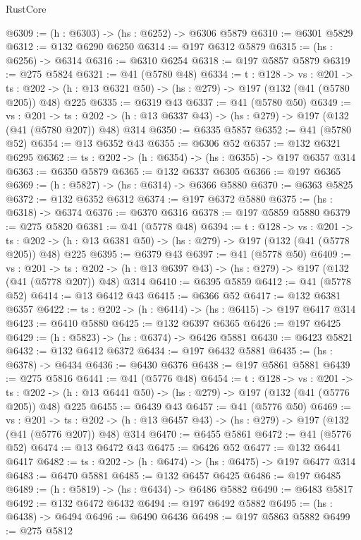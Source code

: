 \begin{lexlean}{RustCore}
\begin{coremodule}
@6309 := (h : @6303) -> (hs : @6252) -> @6306 @5879
@6310 := @6301 @5829
@6312 := @132 @6290 @6250
@6314 := @197 @6312 @5879
@6315 := (hs : @6256) -> @6314
@6316 := @6310 @6254
@6318 := @197 @5857 @5879
@6319 := @275 @5824
@6321 := @41 (@5780 @48)
@6334 := {t : @128} ->
  {vs : @201} ->
  {ts : @202} -> (h : @13 @6321 @50) -> (hs : @279) -> @197 (@132 (@41 (@5780 @205)) @48) @225
@6335 := @6319 @43
@6337 := @41 (@5780 @50)
@6349 := {vs : @201} ->
  {ts : @202} -> (h : @13 @6337 @43) -> (hs : @279) -> @197 (@132 (@41 (@5780 @207)) @48) @314
@6350 := @6335 @5857
@6352 := @41 (@5780 @52)
@6354 := @13 @6352 @43
@6355 := @6306 @52
@6357 := @132 @6321 @6295
@6362 := {ts : @202} -> (h : @6354) -> (hs : @6355) -> @197 @6357 @314
@6363 := @6350 @5879
@6365 := @132 @6337 @6305
@6366 := @197 @6365
@6369 := (h : @5827) -> (hs : @6314) -> @6366 @5880
@6370 := @6363 @5825
@6372 := @132 @6352 @6312
@6374 := @197 @6372 @5880
@6375 := (hs : @6318) -> @6374
@6376 := @6370 @6316
@6378 := @197 @5859 @5880
@6379 := @275 @5820
@6381 := @41 (@5778 @48)
@6394 := {t : @128} ->
  {vs : @201} ->
  {ts : @202} -> (h : @13 @6381 @50) -> (hs : @279) -> @197 (@132 (@41 (@5778 @205)) @48) @225
@6395 := @6379 @43
@6397 := @41 (@5778 @50)
@6409 := {vs : @201} ->
  {ts : @202} -> (h : @13 @6397 @43) -> (hs : @279) -> @197 (@132 (@41 (@5778 @207)) @48) @314
@6410 := @6395 @5859
@6412 := @41 (@5778 @52)
@6414 := @13 @6412 @43
@6415 := @6366 @52
@6417 := @132 @6381 @6357
@6422 := {ts : @202} -> (h : @6414) -> (hs : @6415) -> @197 @6417 @314
@6423 := @6410 @5880
@6425 := @132 @6397 @6365
@6426 := @197 @6425
@6429 := (h : @5823) -> (hs : @6374) -> @6426 @5881
@6430 := @6423 @5821
@6432 := @132 @6412 @6372
@6434 := @197 @6432 @5881
@6435 := (hs : @6378) -> @6434
@6436 := @6430 @6376
@6438 := @197 @5861 @5881
@6439 := @275 @5816
@6441 := @41 (@5776 @48)
@6454 := {t : @128} ->
  {vs : @201} ->
  {ts : @202} -> (h : @13 @6441 @50) -> (hs : @279) -> @197 (@132 (@41 (@5776 @205)) @48) @225
@6455 := @6439 @43
@6457 := @41 (@5776 @50)
@6469 := {vs : @201} ->
  {ts : @202} -> (h : @13 @6457 @43) -> (hs : @279) -> @197 (@132 (@41 (@5776 @207)) @48) @314
@6470 := @6455 @5861
@6472 := @41 (@5776 @52)
@6474 := @13 @6472 @43
@6475 := @6426 @52
@6477 := @132 @6441 @6417
@6482 := {ts : @202} -> (h : @6474) -> (hs : @6475) -> @197 @6477 @314
@6483 := @6470 @5881
@6485 := @132 @6457 @6425
@6486 := @197 @6485
@6489 := (h : @5819) -> (hs : @6434) -> @6486 @5882
@6490 := @6483 @5817
@6492 := @132 @6472 @6432
@6494 := @197 @6492 @5882
@6495 := (hs : @6438) -> @6494
@6496 := @6490 @6436
@6498 := @197 @5863 @5882
@6499 := @275 @5812

\end{coremodule}
\end{lexlean}
